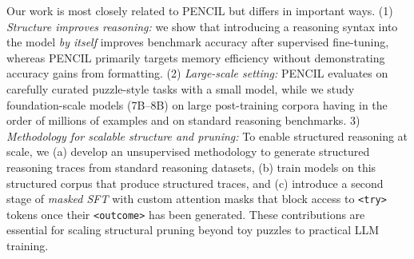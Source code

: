 \documentclass{article}
\begin{document}
Our work is most closely related to PENCIL but differs in important ways.
(1) \emph{Structure improves reasoning:} we show that introducing a reasoning syntax into the model \emph{by itself} improves benchmark accuracy after supervised fine-tuning, whereas PENCIL primarily targets memory efficiency without demonstrating accuracy gains from formatting.
(2) \emph{Large-scale setting:} PENCIL evaluates on carefully curated puzzle-style tasks with a small model, while we study foundation-scale models (7B--8B) on large post-training corpora having in the order of millions of examples and on standard reasoning benchmarks.  
3) \emph{Methodology for scalable structure and pruning:} To enable structured reasoning at scale, we (a) develop an unsupervised methodology to generate structured reasoning traces from standard reasoning datasets, (b) train models on this structured corpus that produce structured traces, and (c) introduce a second stage of \emph{masked SFT} with custom attention masks that block access to \texttt{<try>} tokens once their \texttt{<outcome>} has been generated. These contributions are essential for scaling structural pruning beyond toy puzzles to practical LLM training.  

\end{document}
